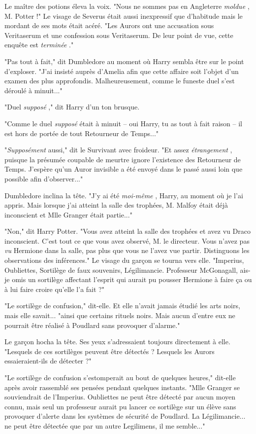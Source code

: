 Le maître des potions éleva la voix. "Nous ne sommes pas en Angleterre \emph{moldue} , M. Potter !" Le visage de Severus était aussi inexpressif que d'habitude mais le mordant de ses mots était acéré. "Les Aurors ont une accusation sous Veritaserum et une confession sous Veritaserum. De leur point de vue, cette enquête est \emph{terminée} ."

"Pas tout à fait," dit Dumbledore au moment où Harry sembla être sur le point d'exploser. "J'ai insisté auprès d'Amelia afin que cette affaire soit l'objet d'un examen des plus approfondis. Malheureusement, comme le funeste duel s'est déroulé à minuit..."

"Duel \emph{supposé} ," dit Harry d'un ton brusque.

"Comme le duel \emph{supposé}  était à minuit – oui Harry, tu as tout à fait raison – il est hors de portée de tout Retourneur de Temps..."

"\emph{Supposément}  aussi," dit le Survivant avec froideur. "Et assez \emph{étrangement} , puisque la présumée coupable de meurtre ignore l'existence des Retourneur de Temps. J'espère qu'un Auror invisible a été envoyé dans le passé aussi loin que possible afin d'observer..."

Dumbledore inclina la tête. "J'y ai été \emph{moi-même} , Harry, au moment où je l'ai appris. Mais lorsque j'ai atteint la salle des trophées, M. Malfoy était déjà inconscient et Mlle Granger était partie..."

"Non," dit Harry Potter. "Vous avez atteint la salle des trophées et avez vu Draco inconscient. C'est tout ce que vous avez observé, M. le directeur. Vous n'avez pas \emph{vu}  Hermione dans la salle, pas plus que vous ne l'avez vue partir. Distinguons les observations des inférences." Le visage du garçon se tourna vers elle. "Imperius, Oubliettes, Sortilège de faux souvenirs, Légilimancie. Professeur McGonagall, ais-je omis un sortilège affectant l'esprit qui aurait pu pousser Hermione à faire ça ou à lui faire croire qu'elle l'a fait ?"

"Le sortilège de confusion," dit-elle. Et elle n'avait jamais étudié les arts noirs, mais elle savait... "ainsi que certains rituels noirs. Mais aucun d'entre eux ne pourrait être réalisé à Poudlard sans provoquer d'alarme."

Le garçon hocha la tête. Ses yeux s'adressaient toujours directement à elle. "Lesquels de ces sortilèges peuvent être détectés ? Lesquels les Aurors essaieraient-ils de détecter ?"

"Le sortilège de confusion s'estomperait au bout de quelques heures," dit-elle après avoir rassemblé ses pensées pendant quelques instants. "Mlle Granger se souviendrait de l'Imperius. Oubliettes ne peut être détecté par aucun moyen connu, mais seul un professeur aurait pu lancer ce sortilège sur un élève sans provoquer d'alerte dans les systèmes de sécurité de Poudlard. La Légilimancie... ne peut être détectée que par un autre Legilimens, il me semble..."

